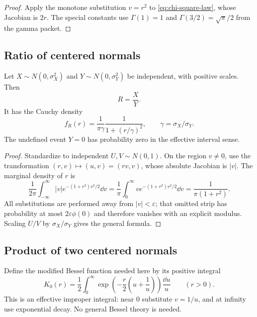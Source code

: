 \begin{proof}
Apply the monotone substitution $v=r^2$ to \eqref{eq:chi-square-law}, whose Jacobian is $2r$.  The special constants use $\Gamma(1)=1$ and $\Gamma(3/2)=\sqrt\pi/2$ from the gamma packet.
\end{proof}

\subsection{Ratio of centered normals}

\begin{theorem}\label{thm:normal-ratio}
Let $X\sim N(0,\sigma_X^2)$ and $Y\sim N(0,\sigma_Y^2)$ be independent, with positive scales.  Then
\begin{equation}\label{eq:cauchy-ratio}
 R=\frac XY.
\end{equation}
It has the Cauchy density
\[
 f_R(r)=\frac{1}{\pi\gamma}\frac{1}{1+(r/\gamma)^2},
 \qquad \gamma=\sigma_X/\sigma_Y.
\]
The undefined event $Y=0$ has probability zero in the effective interval sense.
\end{theorem}

\begin{proof}
Standardize to independent $U,V\sim N(0,1)$.  On the region $v\ne0$, use the transformation $(r,v)\mapsto(u,v)=(rv,v)$, whose absolute Jacobian is $|v|$.  The marginal density of $r$ is
\[
 \frac1{2\pi}\int_{-\infty}^{\infty}|v|e^{-(1+r^2)v^2/2}\dd v
 =\frac1\pi\int_0^\infty v e^{-(1+r^2)v^2/2}\dd v
 =\frac1{\pi(1+r^2)}.
\]
All substitutions are performed away from $|v|<\varepsilon$; that omitted strip has probability at most $2\varepsilon\phi(0)$ and therefore vanishes with an explicit modulus.  Scaling $U/V$ by $\sigma_X/\sigma_Y$ gives the general formula.
\end{proof}

\subsection{Product of two centered normals}

Define the modified Bessel function needed here by its positive integral
\begin{equation}\label{eq:k0-def}
 K_0(r)=\frac12\int_0^\infty
   \exp\!\left(-\frac r2\left(u+\frac1u\right)
\right)\frac{\dd u}{u}
 \qquad(r>0).
\end{equation}
This is an effective improper integral: near $0$ substitute $v=1/u$, and at infinity use exponential decay.  No general Bessel theory is needed.


